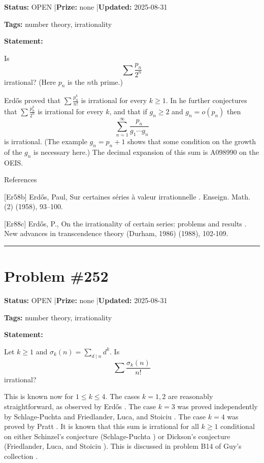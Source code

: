 \documentclass{article}
\begin{document}
\noindent\textbf{Status:} OPEN \quad|\quad \textbf{Prize:} none \quad|\quad \textbf{Updated:} 2025-08-31

\noindent\textbf{Tags:} number theory, irrationality

\medskip

\noindent\textbf{Statement:}

Is\[\sum \frac{p_n}{2^n}\]irrational? (Here $p_n$ is the $n$th prime.)




Erd\H{o}s \cite{Er58b} proved that $\sum \frac{p_n^k}{n!}$ is irrational for every $k\geq 1$. In \cite{Er88c} he further conjectures that $\sum \frac{p_n^k}{2^n}$ is irrational for every $k$, and that if $g_n\geq 2$ and $g_n=o(p_n)$ then\[\sum_{n=1}^\infty \frac{p_n}{g_1\cdots g_n}\]is irrational. (The example $g_n=p_n+1$ shows that some condition on the growth of the $g_n$ is necessary here.) The decimal expansion of this sum is A098990 on the OEIS.




References

[Er58b] Erd\H{o}s, Paul, Sur certaines s\'{e}ries \`a{} valeur irrationnelle . Enseign. Math. (2) (1958), 93--100.

[Er88c] Erd\H{o}s, P., On the irrationality of certain series: problems and results . New advances in transcendence theory (Durham, 1986) (1988), 102-109.

\noindent\rule{\linewidth}{0.4pt}


\section{Problem \#252}
\label{prob:252}

\noindent\textbf{Status:} OPEN \quad|\quad \textbf{Prize:} none \quad|\quad \textbf{Updated:} 2025-08-31

\noindent\textbf{Tags:} number theory, irrationality

\medskip

\noindent\textbf{Statement:}

Let $k\geq 1$ and $\sigma_k(n)=\sum_{d\mid n}d^k$. Is\[\sum \frac{\sigma_k(n)}{n!}\]irrational?




This is known now for $1\leq k\leq 4$. The cases $k=1,2$ are reasonably straightforward, as observed by Erd\H{o}s \cite{Er52}. The case $k=3$ was proved independently by Schlage-Puchta \cite{ScPu06} and Friedlander, Luca, and Stoiciu \cite{FLC07}. The case $k=4$ was proved by Pratt \cite{Pr22}. It is known that this sum is irrational for all $k\geq 1$ conditional on either Schinzel's conjecture (Schlage-Puchta \cite{ScPu06}) or Dickson's conjecture (Friedlander, Luca, and Stoiciu \cite{FLC07}). This is discussed in problem B14 of Guy's collection \cite{Gu04}.
\end{document}
